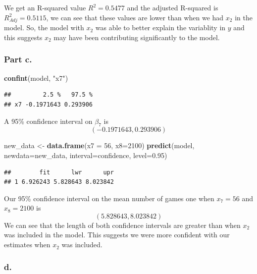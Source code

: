 \documentclass[
  11pt,
]{article}
\newenvironment{Shaded}{\begin{snugshade}}{\end{snugshade}}
\newcommand{\AttributeTok}[1]{\textcolor[rgb]{0.13,0.29,0.53}{#1}}
\newcommand{\DecValTok}[1]{\textcolor[rgb]{0.00,0.00,0.81}{#1}}
\newcommand{\FloatTok}[1]{\textcolor[rgb]{0.00,0.00,0.81}{#1}}
\newcommand{\FunctionTok}[1]{\textcolor[rgb]{0.13,0.29,0.53}{\textbf{#1}}}
\newcommand{\NormalTok}[1]{#1}
\newcommand{\OtherTok}[1]{\textcolor[rgb]{0.56,0.35,0.01}{#1}}
\newcommand{\StringTok}[1]{\textcolor[rgb]{0.31,0.60,0.02}{#1}}
\begin{document}
We get an R-squared value \(R^2 = 0.5477\) and the adjusted R-squared is
\(R^2_{Adj} = 0.5115\), we can see that these values are lower than when
we had \(x_2\) in the model. So, the model with \(x_2\) was able to
better explain the variablity in \(y\) and this suggests \(x_2\) may
have been contributing significantly to the model.

\subsubsection{Part c.}\label{part-c.-2}

\begin{Shaded}
\begin{Highlighting}[]
\FunctionTok{confint}\NormalTok{(model, }\StringTok{"x7"}\NormalTok{)}
\end{Highlighting}
\end{Shaded}

\begin{verbatim}
##         2.5 %   97.5 %
## x7 -0.1971643 0.293906
\end{verbatim}

A 95\% confidence interval on \(\beta_7\) is \[(-0.1971643, 0.293906)\]

\begin{Shaded}
\begin{Highlighting}[]
\NormalTok{new\_data }\OtherTok{\textless{}{-}} \FunctionTok{data.frame}\NormalTok{(}\AttributeTok{x7 =} \DecValTok{56}\NormalTok{, }\AttributeTok{x8=}\DecValTok{2100}\NormalTok{)}
\FunctionTok{predict}\NormalTok{(model, }\AttributeTok{newdata=}\NormalTok{new\_data, }\AttributeTok{interval=}\StringTok{\textquotesingle{}confidence\textquotesingle{}}\NormalTok{, }\AttributeTok{level=}\FloatTok{0.95}\NormalTok{)}
\end{Highlighting}
\end{Shaded}

\begin{verbatim}
##        fit      lwr      upr
## 1 6.926243 5.828643 8.023842
\end{verbatim}

Our 95\% confidence interval on the mean number of games one when
\(x_7 = 56\) and \(x_8 = 2100\) is \[(5.828643, 8.023842)\] We can see
that the length of both confidence intervals are greater than when
\(x_2\) was included in the model. This suggests we were more confident
with our estimates when \(x_2\) was included.

\subsubsection{d.}\label{d.}
\end{document}
